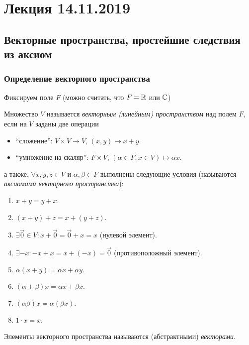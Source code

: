 \section{Лекция 14.11.2019}

\subsection{Векторные пространства, простейшие следствия из аксиом}

\subsubsection{Определение векторного пространства}

Фиксируем поле $F$ (можно считать, что $F = \mathbb{R}$ или $\mathbb{C}$)

\begin{definition}
    Множество $V$ называется \textit{векторным (линейным) пространством} над полем $F$, если на $V$ заданы две операции
    \begin{itemize}[nosep]
    \item ``сложение'': $V \times V \to V$, $(x, y) \mapsto x + y$.
    \item ``умножение на скаляр'': $F \times V$, $(\alpha \in F, x \in V) \mapsto \alpha x$.
    \end{itemize}
    а также, $\forall x, y, z \in V$ и $\alpha, \beta \in F$ выполнены следующие условия (называются \textit{аксиомами векторного пространства}):
    \begin{enumerate}[nosep]
    \item $x + y = y + x$.
    \item $(x + y) + z = x + (y + z)$.
    \item $\exists \overrightarrow{0} \in V : x + \overrightarrow{0} = \overrightarrow{0} + x = x$ (нулевой элемент).
    \item $\exists -x : -x + x = x + (-x) = \overrightarrow{0}$ (противоположный элемент).
    \item $\alpha(x + y) = \alpha x + \alpha y$.
    \item $(\alpha + \beta)x = \alpha x + \beta x$.
    \item $(\alpha \beta)x = \alpha(\beta x)$.
    \item $1 \cdot x = x$.
    \end{enumerate}
\end{definition}

\begin{definition}
    Элементы векторного пространства называются (абстрактными) \textit{векторами}.
\end{definition}

